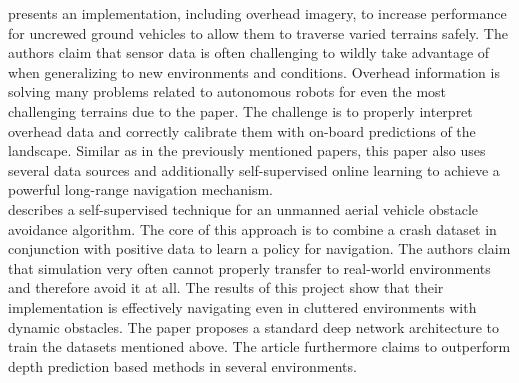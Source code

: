 \cite{roboOverhead} presents an implementation, including overhead imagery, to increase performance for uncrewed ground vehicles to allow them to traverse varied terrains safely. The authors claim that sensor data is often challenging to wildly take advantage of when generalizing to new environments and conditions. Overhead information is solving many problems related to autonomous robots for even the most challenging terrains due to the paper. The challenge is to properly interpret overhead data and correctly calibrate them with on-board predictions of the landscape. Similar as in the previously mentioned papers, this paper also uses several data sources and additionally self-supervised online learning to achieve a powerful long-range navigation mechanism.\\

\cite{g2017learning} describes a self-supervised technique for an unmanned aerial vehicle obstacle avoidance algorithm. The core of this approach is to combine a crash dataset in conjunction with positive data to learn a policy for navigation. The authors claim that simulation very often cannot properly transfer to real-world environments and therefore avoid it at all. The results of this project show that their implementation is effectively navigating even in cluttered environments with dynamic obstacles. The paper proposes a standard deep network architecture to train the datasets mentioned above. The article furthermore claims to outperform depth prediction based methods in several environments.